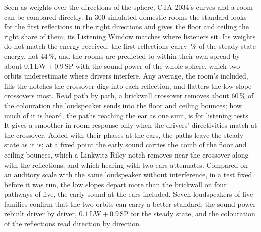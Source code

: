\documentclass[11pt,a4paper]{article}
\begin{document}
Seen as weights over the directions of the sphere, CTA-2034's curves and a room can be compared
directly. In 300 simulated domestic rooms the standard looks for the first reflections in the right
directions and gives the floor and ceiling the right share of them; its Listening Window matches where
listeners sit. Its weights do not match the energy received: the first reflections carry
\nfirstShare\,\% of the steady-state energy, not 44\,\%, and the rooms are predicted to within their own
spread by about $0.1\,\mathrm{LW} + 0.9\,\mathrm{SP}$ with the sound power of the whole sphere, which
two orbits underestimate where drivers interfere. Any average, the room's included, fills the notches
the crossover digs into each reflection, and flatters the low-slope crossovers most. Read path by path,
a brickwall crossover removes about 60\,\% of the colouration the loudspeaker sends into the floor and
ceiling bounces; how much of it is heard, the paths reaching the ear as one sum, is for listening tests.
It gives a smoother in-room response only when the drivers' directivities match at the crossover. Added with their
phases at the ears, the paths leave the steady state as it is; at a fixed point the early sound
carries the comb of the floor and ceiling bounces, which a Linkwitz-Riley notch removes near the
crossover along with the reflections, and which hearing with two ears attenuates. Compared on an
auditory scale with the same loudspeaker without interference, in a test fixed before it was run, the
low slopes depart more than the brickwall on four pathways of five, the early sound at the ears
included. Seven
loudspeakers of five families confirm that the two orbits can carry a better standard: the sound
power rebuilt driver by driver, $0.1\,\mathrm{LW} + 0.9\,\mathrm{SP}$ for the steady state, and the
colouration of the reflections read direction by direction.
\end{document}
